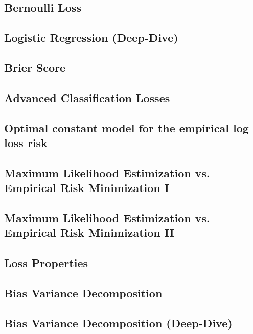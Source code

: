 \subsection{Bernoulli Loss}


\subsection{Logistic Regression (Deep-Dive)}


\subsection{Brier Score}


\subsection{Advanced Classification Losses}


\subsection{Optimal constant model for the empirical log loss risk}


\subsection{Maximum Likelihood Estimization vs. Empirical Risk Minimization I}


\subsection{Maximum Likelihood Estimization vs. Empirical Risk Minimization II}


\subsection{Loss Properties}


\subsection{Bias Variance Decomposition}


\subsection{Bias Variance Decomposition (Deep-Dive)}

